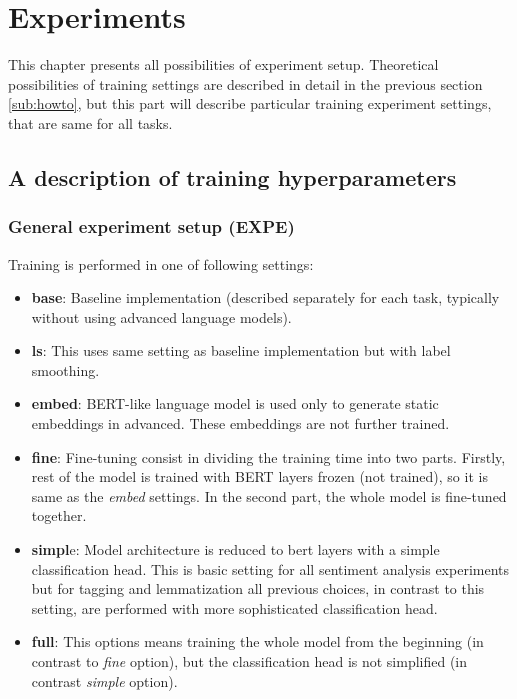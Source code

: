 \chapter{Experiments}
This chapter presents all possibilities of experiment setup. Theoretical possibilities of training settings are described in detail in the previous section \ref{sub:howto}, but this part will describe particular training experiment settings, that are same for all tasks. 
\section{A description of training hyperparameters}
\subsection{General experiment setup (EXPE)}
Training is performed in one of following settings:
\begin{itemize}
\item \textbf{base}: Baseline implementation (described separately for each task, typically without using advanced language models).
\item \textbf{ls}: This uses same setting as baseline implementation but with label smoothing.
\item \textbf{embed}: BERT-like language model is used only to generate static embeddings in advanced. These embeddings are not further trained.
\item \textbf{fine}: Fine-tuning consist in dividing the training time into two parts. Firstly, rest of the model is trained with BERT layers frozen (not trained), so it is same as the \textit{embed} settings. In the second part, the whole model is fine-tuned together.
\item \textbf{simpl}e: Model architecture is reduced to bert layers with a simple classification head. This is basic setting for all sentiment analysis experiments but for tagging and lemmatization all previous choices, in contrast to this setting, are performed with more sophisticated classification head.
\item \textbf{full}: This options means training the whole model from the beginning (in contrast to \textit{fine} option), but the classification head is not simplified (in contrast \textit{simple} option).
\end{itemize}
